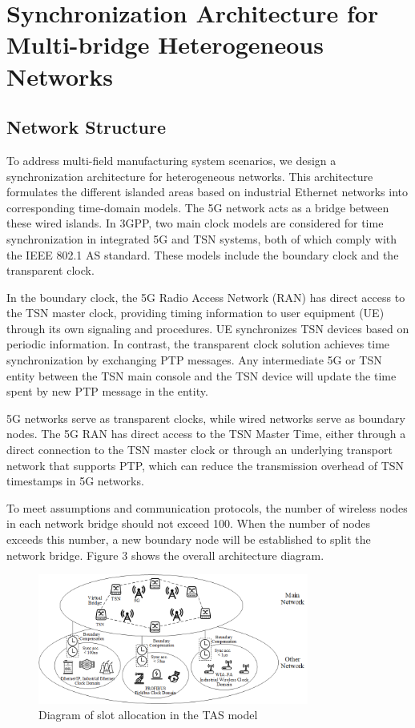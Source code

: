 \documentclass[english]{cccconf}
\begin{document}
\section{ Synchronization Architecture for Multi-bridge Heterogeneous Networks}
\subsection{Network Structure}
To address multi-field manufacturing system scenarios, we design a synchronization architecture for heterogeneous networks. This architecture formulates the different islanded areas based on industrial Ethernet networks into corresponding time-domain models. The 5G network acts as a bridge between these wired islands. In 3GPP, two main clock models are considered for time synchronization in integrated 5G and TSN systems, both of which comply with the IEEE 802.1 AS standard. These models include the boundary clock and the transparent clock\cite{9615318}.

In the boundary clock, the 5G Radio Access Network (RAN) has direct access to the TSN master clock, providing timing information to user equipment (UE) through its own signaling and procedures. UE synchronizes TSN devices based on periodic information. In contrast, the transparent clock solution achieves time synchronization by exchanging PTP messages. Any intermediate 5G or TSN entity between the TSN main console and the TSN device will update the time spent by new PTP message in the entity.

5G networks serve as transparent clocks, while wired networks serve as boundary nodes. The 5G RAN has direct access to the TSN Master Time, either through a direct connection to the TSN master clock or through an underlying transport network that supports PTP, which can reduce the transmission overhead of TSN timestamps in 5G networks.

To meet assumptions and communication protocols, the number of wireless nodes in each network bridge should not exceed 100. When the number of nodes exceeds this number, a new boundary node will be established to split the network bridge. Figure 3 shows the overall architecture diagram.
\begin{figure}[htbp]
	\centering
	\setcounter{figure}{3}
	\includegraphics[width=3.5in]{fig17.png}
	\caption{Diagram of slot allocation in the TAS model}
\end{figure}
\end{document}
